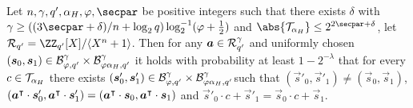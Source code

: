 \begin{lemma}\label{lem:keyhidden}
  Let $n,\otspkkeylen,q',\alpha_H, \varphi,\secpar$ be positive integers such that there exists $\delta$ with $\otspkkeylen\geq((3\secpar+\delta)/n+\log_2q)\log^{-1}_2(\varphi+\tfrac{1}{2})$ and $\abs{\tern_{\alpha_H}} \leq 2^{2\secpar + \delta}$, let $\ring_{q'}=\defringqq$.
  Then for any $\boldsymbol{a}\in\mathcal{R}_{q'}^\gamma$ and uniformly chosen $(\boldsymbol{s}_0,\boldsymbol{s}_1)\in \mathcal{B}_{\varphi, q'}^\gamma \times \mathcal{B}_{\varphi\alpha_H, q'}^\gamma$ it holds with probability at least $1-2^{-\lambda}$ that
  for every $c\in \mathcal{T}_{\alpha_H}$ there exists $(\boldsymbol{s}'_0,\boldsymbol{s}'_1)\in \mathcal{B}_{\varphi, q'}^\gamma \times \mathcal{B}_{\varphi\alpha_H, q'}^\gamma$such that $(\vec{s}'_0,\vec{s}'_1)\neq(\vec{s}_0,\vec{s}_1)$, $(\boldsymbol{a}^\intercal\cdot\boldsymbol{s}'_0,\boldsymbol{a}^\intercal\cdot\boldsymbol{s}'_1) = (\boldsymbol{a}^\intercal\cdot\boldsymbol{s}_0,\boldsymbol{a}^\intercal\cdot\boldsymbol{s}_1)$ and $\vec{s}'_0\cdot c + \vec{s}'_1 = \vec{s}_0\cdot c + \vec{s}_1$.
\end{lemma}
